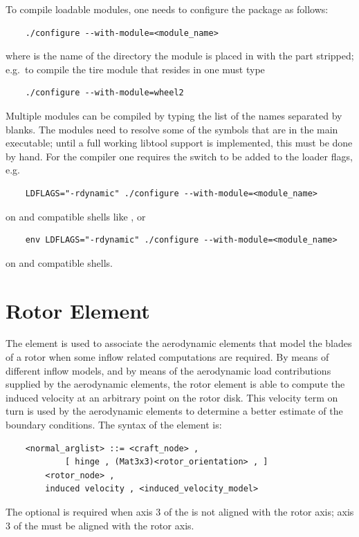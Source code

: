 \noindent
To compile loadable modules, one needs to configure
the package as follows:
\begin{verbatim}
    ./configure --with-module=<module_name>
\end{verbatim}
where  is the name of the directory the module
is placed in with the  part stripped; e.g.\ to compile
the tire module that resides in  
one must type
\begin{verbatim}
    ./configure --with-module=wheel2
\end{verbatim}
Multiple modules can be compiled by typing the list of the names
separated by blanks.
The modules need to resolve some of the symbols that are in the
main executable; until a full working libtool support is implemented,
this must be done by hand.
For the  compiler one requires the switch  
to be added to the loader flags, e.g.
\begin{verbatim}
    LDFLAGS="-rdynamic" ./configure --with-module=<module_name>
\end{verbatim}
on  and compatible shells like , or
\begin{verbatim}
    env LDFLAGS="-rdynamic" ./configure --with-module=<module_name>
\end{verbatim}
on  and compatible shells.





\section{Rotor Element}
The  element is used to associate the aerodynamic elements that
model the blades of a rotor when some inflow related computations are
required. By means of different inflow models, and by means of the
aerodynamic load contributions supplied by the aerodynamic elements, the
rotor element is able to compute the induced velocity at an arbitrary point on
the rotor disk. This velocity term on turn is used by the aerodynamic
elements to determine a better estimate of the boundary conditions.
The syntax of the  element is:
\begin{verbatim}
    <normal_arglist> ::= <craft_node> ,
            [ hinge , (Mat3x3)<rotor_orientation> , ]
        <rotor_node> ,
        induced velocity , <induced_velocity_model>
\end{verbatim}
The optional  is required when axis 3 
of the  is not aligned with the rotor axis; axis 3
of the  must be aligned with the rotor axis.


